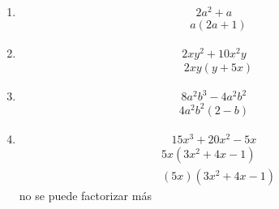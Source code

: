 \documentclass[12pt,letterpaper]{report}
\begin{document}
\begin{enumerate}
\begin{equation*}
3(a+b)+5(a+b)
\end{equation*}
Se observa que tiene de termino comun (a+b), por lo tanto:
\begin{align*}
    &(a+b)(3+5)\\
    &8(a+b)
\end{align*}
\item \begin{equation*}
2a^2+a    
\end{equation*}
\begin{align*}
    &a(2a+1)
\end{align*}
\item \begin{equation*}
    2xy^2+10x^2y
\end{equation*}
\begin{align*}
    &2xy(y+5x)
\end{align*}
\item \begin{equation*}
    8a^2b^3-4a^2b^2
\end{equation*}
\begin{align*}
    4a^2b^2(2-b)
\end{align*}
\item \begin{equation*}
    15x^3+20x^2-5x
\end{equation*}
\begin{align*}
    &5x(3x^2+4x-1)\\
    &(5x)(3x^2+4x-1)
\end{align*}
no se puede factorizar más
\end{enumerate}
\end{document}

